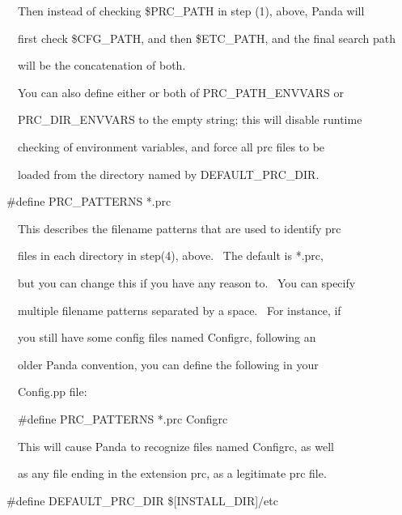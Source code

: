 \documentclass[a4paper]{article}
\begin{document}
{\color{black}
\ \ Then instead of checking \$PRC\_PATH in step (1), above, Panda will}

{\color{black}
\ \ first check \$CFG\_PATH, and then \$ETC\_PATH, and the final search path}

{\color{black}
\ \ will be the concatenation of both.}


\bigskip

{\color{black}
\ \ You can also define either or both of PRC\_PATH\_ENVVARS or}

{\color{black}
\ \ PRC\_DIR\_ENVVARS to the empty string; this will disable runtime}

{\color{black}
\ \ checking of environment variables, and force all prc files to be}

{\color{black}
\ \ loaded from the directory named by DEFAULT\_PRC\_DIR.}


\bigskip

{\color{black}
\#define PRC\_PATTERNS *.prc}


\bigskip

{\color{black}
\ \ This describes the filename patterns that are used to identify prc}

{\color{black}
\ \ files in each directory in step(4), above. \ The default is *.prc,}

{\color{black}
\ \ but you can change this if you have any reason to. \ You can specify}

{\color{black}
\ \ multiple filename patterns separated by a space. \ For instance, if}

{\color{black}
\ \ you still have some config files named {\textquotedbl}Configrc{\textquotedbl}, following an}

{\color{black}
\ \ older Panda convention, you can define the following in your}

{\color{black}
\ \ Config.pp file:}


\bigskip

{\color{black}
\ \ \#define PRC\_PATTERNS *.prc Configrc}


\bigskip

{\color{black}
\ \ This will cause Panda to recognize files named {\textquotedbl}Configrc{\textquotedbl}, as well}

{\color{black}
\ \ as any file ending in the extension prc, as a legitimate prc file.}


\bigskip

\clearpage
\bigskip

{\color{black}
\#define DEFAULT\_PRC\_DIR \$[INSTALL\_DIR]/etc}
\end{document}

